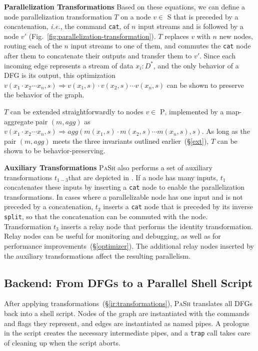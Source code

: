 \documentclass[sigplan, review, screen, anonymous]{acmart}
\newcommand{\ie}{{\em i.e.}, }
\newcommand{\heading}[1]{\vspace{4pt}\noindent\textbf{#1}\enspace}
\newcommand{\ttt}[1]{\texttt{#1}}
\newcommand{\cn}[1]{\mbox{\textcircled{\footnotesize #1}}}
\newcommand{\sta}{\cn{\textsc{S}}\xspace}
\newcommand{\pur}{\cn{\textsc{P}}\xspace}
\newcommand{\todo}[1]{\hl{#1}\xspace}
\newcommand{\nv}[1]{[{\color{cyan}nv: #1}]}
\newcommand{\kk}[1]{[{\color{magenta}kk: #1}]}
\newcommand{\sx}[1]{(\S\ref{#1})}
\newcommand{\sys}{{\scshape PaSh}\xspace}
\begin{document}
\heading{Parallelization Transformations}
%
Based on these equations, we can define a node parallelization
  transformation $T$ on a node $v \in$ \sta that is preceded by a
concatenation, \ie the command \ttt{cat}, of $n$ input streams and is
followed by a node $v'$
(Fig.~\ref{fig:parallelization-transformation}). $T$
replaces $v$ with $n$ new nodes, routing each of the $n$ input streams
to one of them, and commutes the \ttt{cat} node after them to
concatenate their outputs and transfer them to $v'$. Since each
incoming edge represents a stream of data $x_i : D^*$, and the only
behavior of a DFG is its output, this optimization $v(x_1 \cdot x_2
\cdots x_n, s) \Rightarrow v(x_1, s) \cdot v(x_2, s) \cdots v(x_n, s)$
can be shown to preserve the behavior of the graph.

$T$ can be extended straightforwardly to nodes $v \in$ \pur,
implemented by a map-aggregate pair $(m, agg)$ as $ v(x_1 \cdot x_2
\cdots x_n, s) \Rightarrow agg(m(x_1, s) \cdot m(x_2, s) \cdots m(x_n,
s), s)$.
As long as the pair $(m, agg)$ meets the three invariants outlined earlier~\sx{ext}, 
$T$ can be shown to be behavior-preserving.

\heading{Auxiliary Transformations}
%
\sys also performs a set of auxiliary transformations $t_{1-3}$that are
depicted in . If a node has many
inputs, $t_1$ concatenates these inputs by inserting a \ttt{cat} node
to enable the parallelization transformations. In cases where a
parallelizable node has one input and is not preceded by a
concatenation, $t_2$ inserts a \ttt{cat} node that is preceded by its
inverse \ttt{split}, so that the concatenation can be commuted with
the node. Transformation $t_3$ inserts a relay node that
performs the identity transformation. Relay nodes can be useful for
monitoring and debugging, as well as for performance
improvements~\sx{optimizer}.
The additional relay nodes inserted by the auxiliary transformations affect the resulting %
  parallelism.


\subsection{Backend: From DFGs to a Parallel Shell Script}
\label{backend}

After %
  applying transformations~\sx{ir:transformations}, \sys translates all DFGs back into a shell script.
Nodes of the graph are instantiated with the commands and flags they represent, and edges are instantiated as named pipes.
A prologue in the script creates the necessary intermediate pipes, and a \ttt{trap} call takes care of cleaning up when the script aborts.
\end{document}
